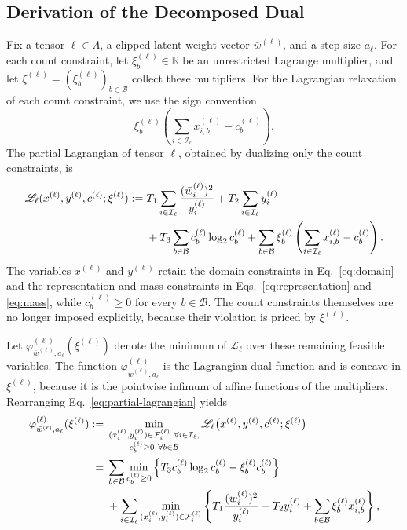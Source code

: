 \documentclass{article}
\begin{document}
\subsection{Derivation of the Decomposed Dual}
\label{app:decomposition}

Fix a tensor $\ell\in\Lambda$, a clipped latent-weight vector
$\bar w^{(\ell)}$, and a step size $a_\ell$. For each count constraint, let
$\xi_b^{(\ell)}\in\mathbb R$ be an unrestricted Lagrange multiplier, and let
$\xi^{(\ell)}=(\xi_b^{(\ell)})_{b\in\mathcal B}$ collect these multipliers. 
For the Lagrangian relaxation of each count constraint, we use the sign convention
\[
  \xi_b^{(\ell)}
  \left(
    \sum_{i\in\mathcal I_\ell}x_{i,b}^{(\ell)}-c_b^{(\ell)}
  \right).
\]
The partial Lagrangian of tensor $\ell$, obtained by dualizing only the count constraints, is
\begin{align}
 \mathscr L_\ell(x^{(\ell)},y^{(\ell)},c^{(\ell)};
                  \xi^{(\ell)})
 :=\;&
 T_1\sum_{i\in\mathcal I_\ell}
      \frac{(\bar w_i^{(\ell)})^2}{y_i^{(\ell)}}
 +T_2\sum_{i\in\mathcal I_\ell}y_i^{(\ell)}
 \notag\\
 &+T_3\sum_{b\in\mathcal B}
      c_b^{(\ell)}\log_2 c_b^{(\ell)}
 +\sum_{b\in\mathcal B}\xi_b^{(\ell)}
   \left(
     \sum_{i\in\mathcal I_\ell}x_{i,b}^{(\ell)}-c_b^{(\ell)}
   \right).
 \label{eq:partial-lagrangian}
\end{align}
The variables $x^{(\ell)}$ and $y^{(\ell)}$ retain the domain constraints in
Eq.~\eqref{eq:domain} and the representation and mass constraints in
Eqs.~\eqref{eq:representation} and \eqref{eq:mass}, while
$c_b^{(\ell)}\geq 0$ for every $b\in\mathcal B$. The count constraints
themselves are no longer imposed explicitly, because their violation is priced
by $\xi^{(\ell)}$.

Let $\varphi_{\bar w^{(\ell)},a_\ell}^{(\ell)}(\xi^{(\ell)})$ denote the minimum of
$\mathscr L_\ell$ over these remaining feasible variables. The function
$\varphi_{\bar w^{(\ell)},a_\ell}^{(\ell)}$ is the Lagrangian dual function and is concave in
$\xi^{(\ell)}$, because it is the pointwise infimum of affine functions of the
multipliers. Rearranging Eq.~\eqref{eq:partial-lagrangian} yields
\begin{align}
 \varphi_{\bar w^{(\ell)},a_\ell}^{(\ell)}(\xi^{(\ell)})
 :={}&
 \min_{\substack{
       (x_i^{(\ell)},y_i^{(\ell)})\in\mathcal F_i^{(\ell)}
       \ \forall i\in\mathcal I_\ell,\\
       c_b^{(\ell)}\geq0\ \forall b\in\mathcal B}}
 \mathscr L_\ell
 \bigl(x^{(\ell)},y^{(\ell)},c^{(\ell)};\xi^{(\ell)}\bigr)
 \notag\\
 ={}&
 \sum_{b\in\mathcal B}
 \min_{c_b^{(\ell)}\geq0}
 \left\{
   T_3c_b^{(\ell)}\log_2c_b^{(\ell)}
   -\xi_b^{(\ell)}c_b^{(\ell)}
 \right\}
 \notag\\
 &+\sum_{i\in\mathcal I_\ell}
 \min_{(x_i^{(\ell)},y_i^{(\ell)})\in
       \mathcal F_i^{(\ell)}}
 \left\{
   T_1\frac{(\bar w_i^{(\ell)})^2}{y_i^{(\ell)}}
   +T_2y_i^{(\ell)}
   +\sum_{b\in\mathcal B}
      \xi_b^{(\ell)}x_{i,b}^{(\ell)}
 \right\},
\end{align}
\end{document}
